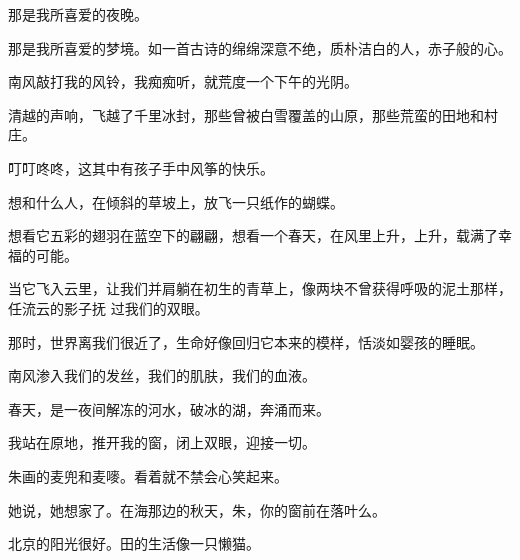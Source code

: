 \documentclass[12pt,a4paper]{article}
\begin{document}
		那是我所喜爱的夜晚。\par
		那是我所喜爱的梦境。如一首古诗的绵绵深意不绝，质朴洁白的人，赤子般的心。

		南风敲打我的风铃，我痴痴听，就荒度一个下午的光阴。\par
		清越的声响，飞越了千里冰封，那些曾被白雪覆盖的山原，那些荒蛮的田地和村庄。

		叮叮咚咚，这其中有孩子手中风筝的快乐。

		想和什么人，在倾斜的草坡上，放飞一只纸作的蝴蝶。\par
		想看它五彩的翅羽在蓝空下的翩翩，想看一个春天，在风里上升，上升，载满了幸福的可能。

		当它飞入云里，让我们并肩躺在初生的青草上，像两块不曾获得呼吸的泥土那样，任流云的影子抚
	过我们的双眼。

		那时，世界离我们很近了，生命好像回归它本来的模样，恬淡如婴孩的睡眠。

		南风渗入我们的发丝，我们的肌肤，我们的血液。

		春天，是一夜间解冻的河水，破冰的湖，奔涌而来。\par
		我站在原地，推开我的窗，闭上双眼，迎接一切。

	\endwriting



		朱画的麦兜和麦嘜。看着就不禁会心笑起来。\par
		她说，她想家了。在海那边的秋天，朱，你的窗前在落叶么。\par
		北京的阳光很好。田的生活像一只懒猫。
\end{document}
